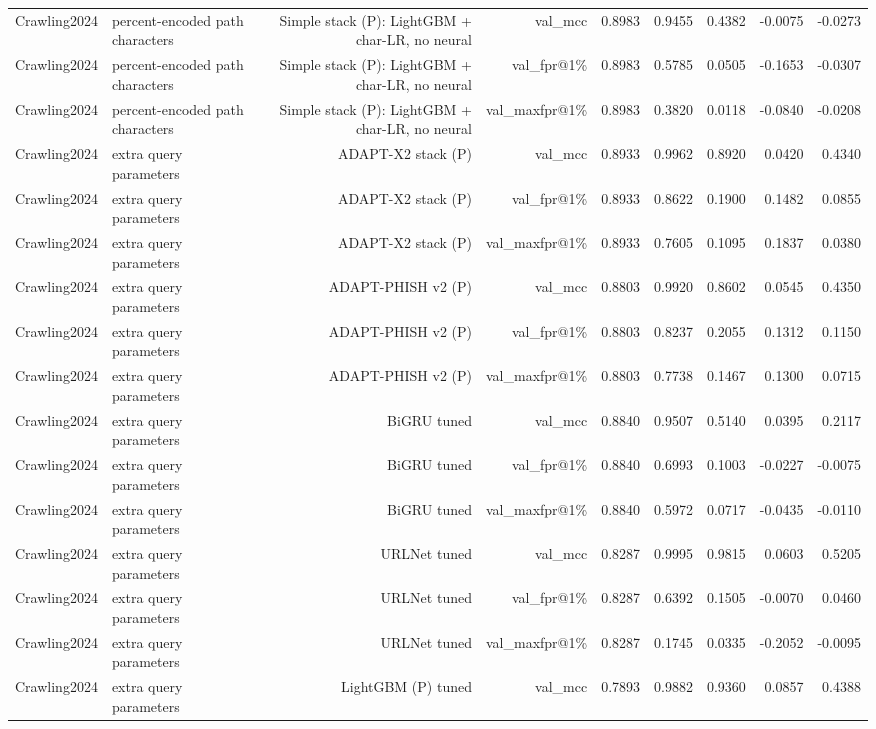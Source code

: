 \begin{table}[t]
\begin{tabular}{llrrrrrrr}
Crawling2024 & percent-encoded path characters & Simple stack (P): LightGBM + char-LR, no neural & val\_mcc & 0.8983 & 0.9455 & 0.4382 & -0.0075 & -0.0273 \\
Crawling2024 & percent-encoded path characters & Simple stack (P): LightGBM + char-LR, no neural & val\_fpr@1\% & 0.8983 & 0.5785 & 0.0505 & -0.1653 & -0.0307 \\
Crawling2024 & percent-encoded path characters & Simple stack (P): LightGBM + char-LR, no neural & val\_maxfpr@1\% & 0.8983 & 0.3820 & 0.0118 & -0.0840 & -0.0208 \\
Crawling2024 & extra query parameters & ADAPT-X2 stack (P) & val\_mcc & 0.8933 & 0.9962 & 0.8920 & 0.0420 & 0.4340 \\
Crawling2024 & extra query parameters & ADAPT-X2 stack (P) & val\_fpr@1\% & 0.8933 & 0.8622 & 0.1900 & 0.1482 & 0.0855 \\
Crawling2024 & extra query parameters & ADAPT-X2 stack (P) & val\_maxfpr@1\% & 0.8933 & 0.7605 & 0.1095 & 0.1837 & 0.0380 \\
Crawling2024 & extra query parameters & ADAPT-PHISH v2 (P) & val\_mcc & 0.8803 & 0.9920 & 0.8602 & 0.0545 & 0.4350 \\
Crawling2024 & extra query parameters & ADAPT-PHISH v2 (P) & val\_fpr@1\% & 0.8803 & 0.8237 & 0.2055 & 0.1312 & 0.1150 \\
Crawling2024 & extra query parameters & ADAPT-PHISH v2 (P) & val\_maxfpr@1\% & 0.8803 & 0.7738 & 0.1467 & 0.1300 & 0.0715 \\
Crawling2024 & extra query parameters & BiGRU tuned & val\_mcc & 0.8840 & 0.9507 & 0.5140 & 0.0395 & 0.2117 \\
Crawling2024 & extra query parameters & BiGRU tuned & val\_fpr@1\% & 0.8840 & 0.6993 & 0.1003 & -0.0227 & -0.0075 \\
Crawling2024 & extra query parameters & BiGRU tuned & val\_maxfpr@1\% & 0.8840 & 0.5972 & 0.0717 & -0.0435 & -0.0110 \\
Crawling2024 & extra query parameters & URLNet tuned & val\_mcc & 0.8287 & 0.9995 & 0.9815 & 0.0603 & 0.5205 \\
Crawling2024 & extra query parameters & URLNet tuned & val\_fpr@1\% & 0.8287 & 0.6392 & 0.1505 & -0.0070 & 0.0460 \\
Crawling2024 & extra query parameters & URLNet tuned & val\_maxfpr@1\% & 0.8287 & 0.1745 & 0.0335 & -0.2052 & -0.0095 \\
Crawling2024 & extra query parameters & LightGBM (P) tuned & val\_mcc & 0.7893 & 0.9882 & 0.9360 & 0.0857 & 0.4388 \\

\end{tabular}
\end{table}
